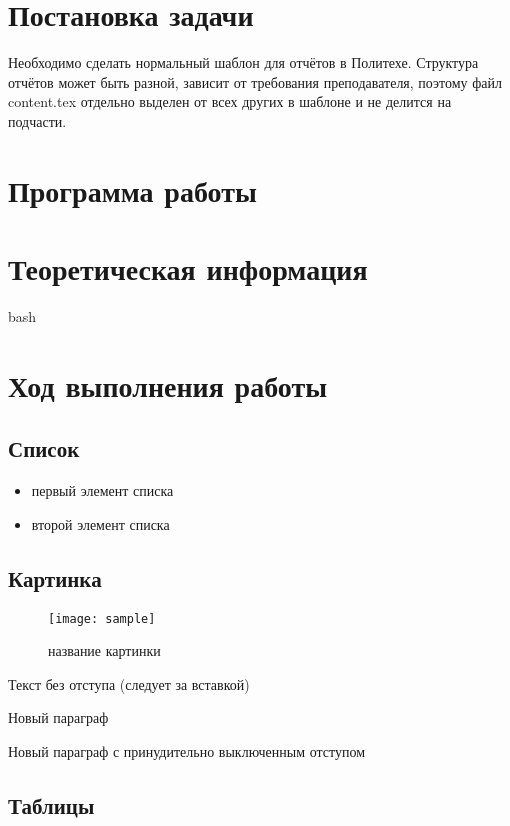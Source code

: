 \section*{Постановка задачи}
Необходимо сделать нормальный шаблон для отчётов в Политехе. Структура отчётов может быть разной, зависит от требования преподавателя, поэтому файл content.tex отдельно выделен от всех других в шаблоне и не делится на подчасти.

\newpage
\section{Программа работы}
\section{Теоретическая информация}
bash \cite{bash}
\section{Ход выполнения работы}

\subsection{Список}

\begin{itemize}
\item первый элемент списка
\item второй элемент списка
\end{itemize}


\subsection{Картинка}

\begin{figure}[H]
	\begin{center}
		\texttt{[image: sample]}
		\caption{название картинки} 
		\label{pic:pic_name} %
	\end{center}
\end{figure}

Текст без отступа (следует за вставкой)

Новый параграф

\noindent Новый параграф с принудительно выключенным отступом


\subsection{Таблицы}


